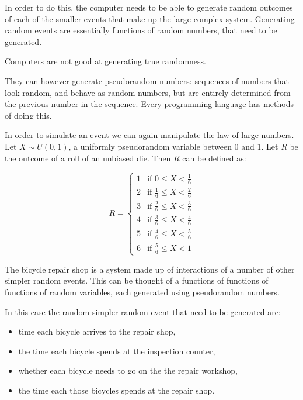In order to do this, the computer needs to be able to generate random outcomes
of each of the smaller events that make up the large complex system. Generating
random events are essentially functions of random numbers, that need to be
generated.

Computers are not good at generating true randomness.

They can however generate pseudorandom numbers: sequences of numbers that look
random, and behave as random numbers, but are entirely determined from the
previous number in the sequence. Every programming language has methods of doing
this.

In order to simulate an event we can again manipulate the law of large numbers.
Let $X \sim U(0, 1)$, a uniformly pseudorandom variable between 0 and 1.
Let $R$ be the outcome of a roll of an unbiased die. Then $R$ can be defined as:

\begin{equation}
R =
  \begin{cases}
    1 & \text{if } 0 \leq X < \frac{1}{6}\\
    2 & \text{if } \frac{1}{6} \leq X < \frac{2}{6}\\
    3 & \text{if } \frac{2}{6} \leq X < \frac{3}{6}\\
    4 & \text{if } \frac{3}{6} \leq X < \frac{4}{6}\\
    5 & \text{if } \frac{4}{6} \leq X < \frac{5}{6}\\
    6 & \text{if } \frac{5}{6} \leq X < 1
  \end{cases}
\end{equation}

The bicycle repair shop is a system made up of interactions of a number of other
simpler random events. This can be thought of a functions of functions of
functions of random variables, each generated using pseudorandom numbers.

In this case the random simpler random event that need to be generated are:
\begin{itemize}
  \item time each bicycle arrives to the repair shop,
  \item the time each bicycle spends at the inspection counter,
  \item whether each bicycle needs to go on the the repair workshop,
  \item the time each those bicycles spends at the repair shop.
\end{itemize}

